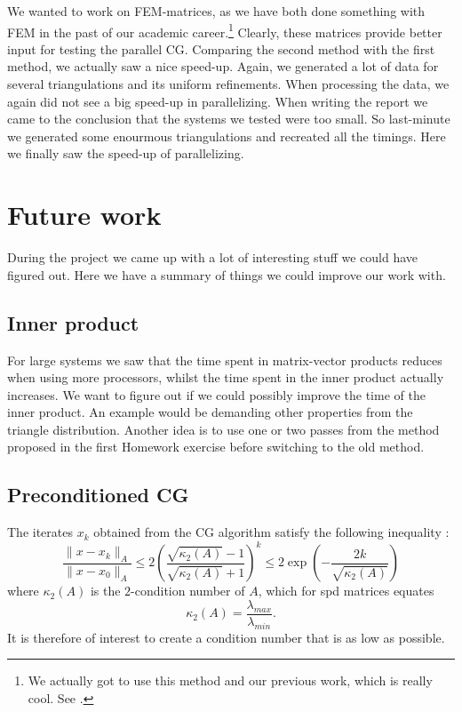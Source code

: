 \documentclass[11pt]{amsart}
\theoremstyle{definition}
\begin{document}
We wanted to work on FEM-matrices, as we have both done something with FEM in the past of our academic career.\footnote{We actually got to use this method and our previous work, which is really cool. See \cite{TODOCITES}.} Clearly, these matrices provide better input for testing the parallel CG. Comparing the second method with the first method, we actually saw a nice speed-up. Again, we generated a lot of data for several triangulations and its uniform refinements. When processing the data, we again did not see a big speed-up in parallelizing. When writing the report we came to the conclusion that the systems we tested were too small. So last-minute we generated some enourmous triangulations and recreated all the timings. Here we finally saw the speed-up of parallelizing.

\section{Future work}
During the project we came up with a lot of interesting stuff we could have figured out. Here we have a summary of things we could improve our work with.
\subsection{Inner product}
For large systems we saw that the time spent in matrix-vector products reduces when using more processors, whilst the time spent in the inner product actually increases. We want to figure out if we could possibly improve the time of the inner product. An example would be demanding other properties from the triangle distribution. Another idea is to use one or two passes from the method proposed in the first Homework exercise before switching to the old method.
\subsection{Preconditioned CG}
The iterates $x_k$ obtained from the CG algorithm satisfy the following inequality \cite[Lect.~7]{sleij}:
\[
  \frac{\|x - x_k\|_A}{\|x - x_0\|_A} \leq 2 \left( \frac{ \sqrt{\kappa_2(A)}-1}{\sqrt{\kappa_2(A)}+1}\right)^k \leq 2 \exp \left( -\frac{2k}{\sqrt{\kappa_2(A)}}\right) 
\]
where $\kappa_2(A)$ is the $2$-condition number of $A$, which for spd matrices equates
\[
  \kappa_2(A) = \frac{\lambda_{max}}{\lambda_{min}}.
\]
It is therefore of interest to create a condition number that is as low as possible.
\end{document}
